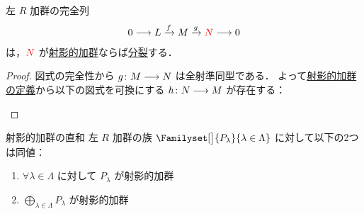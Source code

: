 \documentclass[algtopo_main]{subfiles}
\begin{document}
\begin{myprop}[label=prop:proj-mod-split]{}
    左 $R$ 加群の完全列
    \begin{align}
        0 \longrightarrow L \xrightarrow{f} M \xrightarrow{g} \textcolor{red}{N} \longrightarrow 0
    \end{align}
    は，$\textcolor{red}{N}$ が\hyperref[def:proj-mod]{射影的加群}ならば\hyperref[def:split]{分裂}する．
\end{myprop}

\begin{proof}
    図式の完全性から $g \colon M \longrightarrow N$ は全射準同型である．
    よって\hyperref[def:proj-mod]{射影的加群の定義}から以下の図式を可換にする $h \colon N \longrightarrow M$ が存在する：
    \begin{center}
    \end{center}
\end{proof}

\begin{myprop}[label=prop:proj-mod-dp]{射影的加群の直和}
    左 $R$ 加群の族 $\Familyset[\big]{P_\lambda}{\lambda \in \Lambda}$ に対して以下の2つは同値：
    \begin{enumerate}
        \item $\forall \lambda \in \Lambda$ に対して $P_\lambda$ が射影的加群
        \item $\displaystyle\bigoplus_{\lambda \in \Lambda} P_\lambda$ が射影的加群
    \end{enumerate}
\end{myprop}
\end{document}
